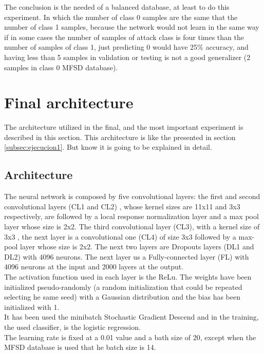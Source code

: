 The conclusion is the needed of a balanced database, at least to do this experiment. In which the number of class 0 samples are the same that the number of class 1 samples, because the network would not learn in the same way if in some cases the number of samples of  attack class is four times than the number of samples of class 1, just predicting 0 would have 25\% accuracy, and having less than 5 samples in validation or testing is not a good generalizer (2 samples in class 0 MFSD database).\\

\section{Final architecture}\label{Final_archi} %
The architecture utilized in the final, and the most important experiment is described in this section. This architecture is like the presented in section \ref{subsec:ejecucion1}. But know it is going to be explained in detail.\\

\subsection{Architecture}
The neural network is composed by five convolutional layers: the first and second convolutional layers (CL1 and CL2) , whose kernel sizes are 11x11 and 3x3 respectively, are followed by a local response normalization layer and a max pool layer whose size is 2x2. The third convolutional layer (CL3), with a kernel size of 3x3 , the next layer is a convolutional one (CL4) of size 3x3 followed by a max-pool layer whose size is 2x2. The next two layers are Dropouts layers (DL1 and DL2) with 4096 neurons. The next layer us a Fully-connected layer (FL) with 4096 neurons at the input and 2000 layers at the output.\\

The activation function used in each layer is the ReLu. The weights have been initialized pseudo-randomly (a random initialization that could be repeated selecting he same seed) with a Gaussian distribution and the bias has been initialized with 1.\\

It has been used the minibatch Stochastic Gradient Descend and in the training, the used classifier, is the logistic regression.\\

The learning rate is fixed at a 0.01 value and a bath size of 20, except when the MFSD database is used that he batch size is 14.\\

